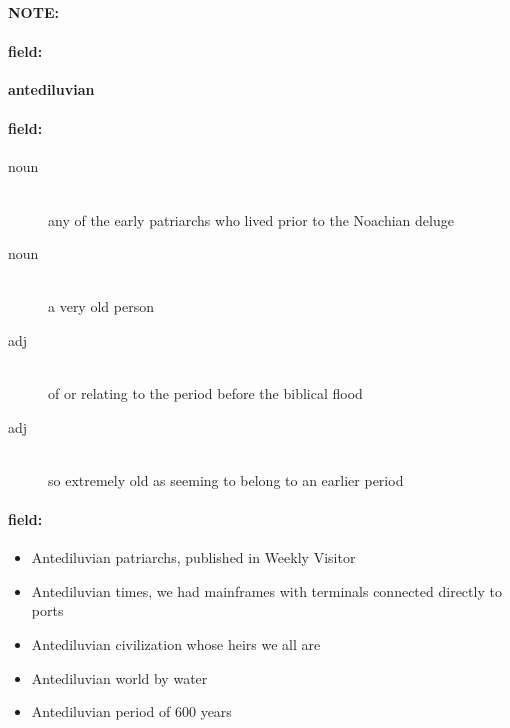 \documentclass[12pt]{article}
\newenvironment{note}{\paragraph{NOTE:}}{}
\newenvironment{field}{\paragraph{field:}}{}
\begin{document}
\begin{note}
\begin{field}
\textbf{\large antediluvian}
\end{field}


\begin{field}
\begin{description}
\item[noun] \hfill \\ 
any of the early patriarchs who lived prior to the Noachian deluge

\item[noun] \hfill \\ 
a very old person

\item[adj] \hfill \\ 
of or relating to the period before the biblical flood

\item[adj] \hfill \\ 
so extremely old as seeming to belong to an earlier period

\end{description}
\end{field}

\begin{field}
\begin{itemize}
\item Antediluvian patriarchs, published in Weekly Visitor
\item Antediluvian times, we had mainframes with terminals connected directly to ports
\item Antediluvian civilization whose heirs we all are
\item Antediluvian world by water
\item Antediluvian period of 600 years
\end{itemize}
\end{field}
\end{note}
\end{document}
